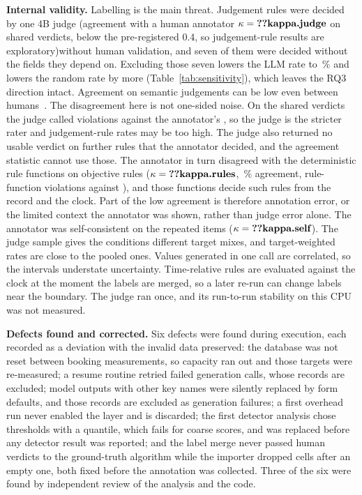 \documentclass[conference]{IEEEtran}
\begin{document}
\textbf{Internal validity.} Labelling is the main threat. Judgement rules were decided by one 4B judge
\ifhumanlabels (agreement with a human annotator $\kappa=\R{kappa.judge}$ on  shared
verdicts, below the pre-registered 0.4, so judgement-rule results are exploratory)\else without human
validation\fi, and seven of them were decided without the fields they depend on. Excluding those seven
lowers the LLM rate to \,\% and lowers the random rate by more
(Table~\ref{tab:sensitivity}), which leaves the RQ3 direction intact. Agreement on semantic judgements
can be low even between humans~\cite{calo2026semanticgap}.\ifhumanlabels{} The disagreement here is not
one-sided noise. On the shared verdicts the judge called  violations against the
annotator's , so the judge is the stricter rater and judgement-rule rates may be
too high. The judge also returned no usable verdict on  further rules that the
annotator decided, and the agreement statistic cannot use those. The annotator in turn disagreed with
the deterministic rule functions on objective rules ($\kappa=\R{kappa.rules}$, \,\%
agreement,  rule-function violations against ), and those
functions decide such rules from the record and the clock. Part of the low agreement is therefore
annotation error, or the limited context the annotator was shown, rather than judge error alone. The
annotator was self-consistent on the repeated items ($\kappa=\R{kappa.self}$).\fi{} The judge sample
gives the conditions different target mixes, and target-weighted rates are close to the pooled ones.
Values generated in one call are correlated, so the intervals understate uncertainty. Time-relative
rules are evaluated against the clock at the moment the labels are merged, so a later re-run can change
labels near the boundary. The judge ran once, and its run-to-run stability on this CPU was not
measured.

\textbf{Defects found and corrected.} Six defects were found during execution, each recorded as a
deviation with the invalid data preserved: the database was not reset between booking measurements, so
capacity ran out and those targets were re-measured; a resume routine retried failed generation calls,
whose records are excluded; model outputs with other key names were silently replaced by form defaults,
and those records are excluded as generation failures; a first overhead run never enabled the layer and
is discarded; the first detector analysis chose thresholds with a quantile, which fails for coarse
scores, and was replaced before any detector result was reported; and the label merge never passed
human verdicts to the ground-truth algorithm while the importer dropped cells after an empty one, both
fixed before the annotation was collected. Three of the six were found by independent review of the
analysis and the code.
\end{document}
